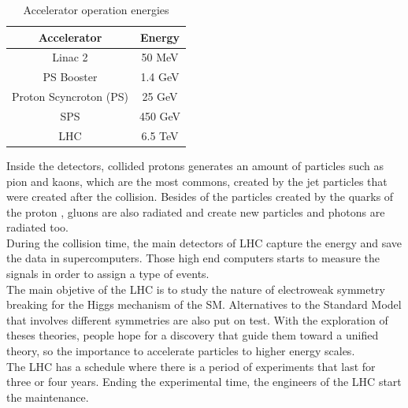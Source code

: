 \begin{table}[!htbp]
\centering
	\caption{Accelerator operation energies\cite{cern3,cern1}}
	\begin{tabular}{|c|c|}
		\hline
		Accelerator & Energy \\
		\hline
		Linac 2 &  50 MeV \\
		\hline
		PS Booster & 1.4 GeV \\
		\hline
		Proton Scyncroton (PS) & 25 GeV\\
		\hline
		SPS &  450 GeV\\
		\hline
		LHC & 6.5 TeV\\
		\hline
	\end{tabular}
\end{table}
\pagebreak
Inside the detectors, collided protons generates an amount of particles such as pion and kaons, which are the most commons, created by the jet particles that were created after the collision. Besides of the particles created by the quarks of the proton , gluons are also radiated and create new particles and photons are radiated too. \\
During the collision time, the main  detectors of LHC capture the energy 
and save the data in supercomputers. Those high end computers starts to measure the signals in order to assign a type of events.
\\

The main objetive of the LHC is to study the nature of electroweak symmetry breaking for the Higgs mechanism of the SM. 
Alternatives to the Standard Model that involves different symmetries are also put on test. With the exploration of theses theories, people hope for a discovery that guide them toward a unified theory, so the importance to accelerate particles to higher energy scales.
\\
The LHC has a schedule where there is a period of experiments that last for three or four years. Ending the experimental time, the engineers of the LHC start the maintenance.

